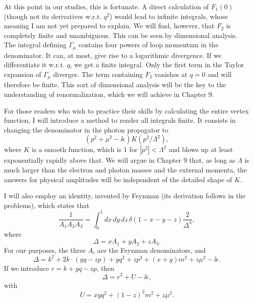 
At this point in our studies, this is fortunate. A direct calculation of $F_1(0)$ (though
not its derivatives w.r.t. $q^2$) would lead to infinite integrals, whose meaning I am not
yet prepared to explain. We will find, however, that $F_2$ is completely finite and
unambiguous. This can be seen by dimensional analysis. The integral defining $\Gamma_\mu$ contains
four powers of loop momentum in the denominator. It can, at most, give rise to a
logarithmic divergence. If we differentiate it w.r.t. $q$, we get a finite integral. Only the
first term in the Taylor expansion of $\Gamma_\mu$ diverges. The term containing $F_2$ vanishes at
$q=0$ and will therefore be finite. This sort of dimensional analysis will be the key to
the understanding of renormalization, which we will achieve in Chapter 9.

For those readers who wish to practice their skills by calculating the entire vertex
function, I will introduce a method to render all integrals finite. It consists in changing
the denominator in the photon propagator to
\begin{equation*}
  (p^2+\mu^2-\ii\epsilon)K(p^2/\Lambda^2),
\end{equation*}
where $K$ is a smooth function, which is 1 for $|p^2|<\Lambda^2$ and blows up at least exponentially rapidly
above that. We will argue in Chapter 9 that, as long as $\Lambda$ is much larger than the electron
and photon masses and the external momenta, the answers for physical amplitudes will be
independent of the detailed shape of $K$.

I will also employ an identity, invented by Feynman (its derivation follows in the
problems), which states that
\begin{equation*}
  \frac{1}{A_1A_2A_3}=\int_0^1 dx\,dy\,dz\,\delta(1-x-y-z)\frac{2}{\Delta^3},
\end{equation*}
where
\begin{equation*}
  \Delta=xA_1+yA_2+zA_3.
\end{equation*}
For our purposes, the three $A_i$ are the Feynman denominators, and
\begin{equation*}
  \Delta=k^2+2k\!\cdot(yq-zp)+yq^2+zp^2+(x+y)m^2+z\mu^2-\ii\epsilon.
\end{equation*}
If we introduce $r=k+yq-zp$, then
\begin{equation*}
  \Delta=r^2+U-\ii\epsilon,
\end{equation*}
with
\begin{equation*}
  U=xyq^2+(1-z)^2m^2+z\mu^2.
\end{equation*}

